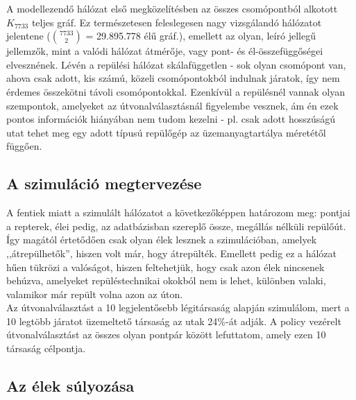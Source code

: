     A modellezendő hálózat első megközelítésben az összes csomópontból alkotott $K_{7733}$ teljes gráf. Ez természetesen feleslegesen nagy vizsgálandó hálózatot jelentene ($7733 \choose 2$ = 29.895.778 élű gráf.), emellett az olyan, leíró jellegű jellemzők, mint a valódi hálózat átmérője, vagy pont- és él-összefüggőségei elvesznének. Lévén a repülési hálózat skálafüggetlen - sok olyan csomópont van, ahova csak adott, kis számú, közeli csomópontokból indulnak járatok, így nem érdemes összekötni távoli csomópontokkal. Ezenkívül a repülésnél vannak olyan szempontok, amelyeket az útvonalválasztásnál figyelembe vesznek, ám én ezek pontos információk hiányában nem tudom kezelni - pl. csak adott hosszúságú utat tehet meg egy adott típusú repülőgép az üzemanyagtartálya méretétől függően.

    \subsection{A szimuláció megtervezése}

    A fentiek miatt a szimulált hálózatot a következőképpen határozom meg: pontjai a repterek, élei pedig, az adatbázisban szereplő össze, megállás nélküli repülőút. Így magától értetődően csak olyan élek lesznek a szimulációban, amelyek ,,átrepülhetők'', hiszen volt már, hogy átrepülték. Emellett pedig ez a hálózat hűen tükrözi a valóságot, hiszen feltehetjük, hogy csak azon élek nincsenek behúzva, amelyeket repüléstechnikai okokból nem is lehet, különben valaki, valamikor már repült volna azon az úton.\\

    Az útvonalválasztást a 10 legjelentősebb légitársaság alapján szimulálom, mert a 10 legtöbb járatot üzemeltető társaság az utak 24\%-át adják. A policy vezérelt útvonalválasztást az összes olyan pontpár között lefuttatom, amely ezen 10 társaság célpontja.



    \subsection{Az élek súlyozása}

